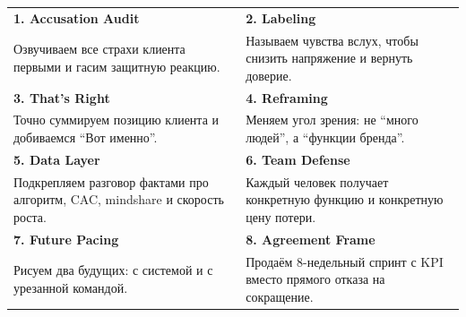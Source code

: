 \documentclass[11pt,a4paper]{article}
\begin{document}
\begin{glassbox}
\begin{tabularx}{\linewidth}{Y Y}
\textbf{1. Accusation Audit} & \textbf{2. Labeling} \\
\fontsize{9.8}{12}\selectfont Озвучиваем все страхи клиента первыми и гасим защитную реакцию. &
\fontsize{9.8}{12}\selectfont Называем чувства вслух, чтобы снизить напряжение и вернуть доверие. \\
\textbf{3. That's Right} & \textbf{4. Reframing} \\
\fontsize{9.8}{12}\selectfont Точно суммируем позицию клиента и добиваемся ``Вот именно''. &
\fontsize{9.8}{12}\selectfont Меняем угол зрения: не ``много людей'', а ``функции бренда''. \\
\textbf{5. Data Layer} & \textbf{6. Team Defense} \\
\fontsize{9.8}{12}\selectfont Подкрепляем разговор фактами про алгоритм, CAC, mindshare и скорость роста. &
\fontsize{9.8}{12}\selectfont Каждый человек получает конкретную функцию и конкретную цену потери. \\
\textbf{7. Future Pacing} & \textbf{8. Agreement Frame} \\
\fontsize{9.8}{12}\selectfont Рисуем два будущих: с системой и с урезанной командой. &
\fontsize{9.8}{12}\selectfont Продаём 8-недельный спринт с KPI вместо прямого отказа на сокращение. \\
\end{tabularx}
\end{glassbox}

\vspace{4mm}
\end{document}
